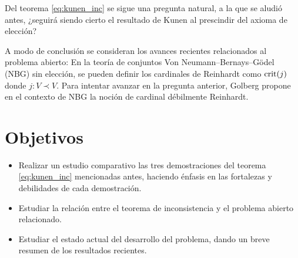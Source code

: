 \documentclass[12pt]{article}
\begin{document}
    Del teorema \ref{eq:kunen_inc} se sigue una pregunta natural, a la que se aludió antes, ¿seguirá siendo
    cierto el resultado de Kunen al prescindir del axioma de elección? 

    A modo de conclusión se consideran los avances recientes relacionados al problema abierto:
    En la teoría de conjuntos Von Neumann–Bernays–Gödel (NBG) sin elección, se pueden definir los cardinales de Reinhardt como $\mathrm { crit } ( j )$
    donde $j\colon V\prec V$. Para intentar avanzar en la pregunta anterior,
    Golberg \cite{goldberg_reinhardt_2021} propone en el contexto de NBG la noción de cardinal débilmente Reinhardt.
    
    \section{Objetivos}
    \begin{itemize}
        \item Realizar un estudio comparativo las tres demostraciones del teorema \ref{eq:kunen_inc} mencionadas antes,
        haciendo énfasis en las fortalezas y debilidades de cada demostración.
        \item Estudiar la relación entre el teorema de inconsistencia y el problema abierto relacionado.
        \item Estudiar el estado actual del desarrollo del problema, dando un breve resumen de los resultados recientes. 
    \end{itemize}

    \nocite{jech_set_2003}
    \nocite{kanamori_mathematical_1996}
    \singlespacing
    \sloppy
    \printbibliography
\end{document}
